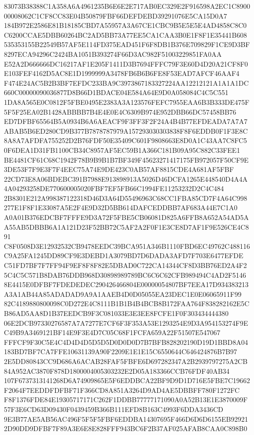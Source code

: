 \documentclass[UTF8,fontset=fandol,zihao=-4,a4paper]{ctexart}
\begin{document}
{{83073B38388C1A358A6A4961235B6E6E2E717AB0EC329E2F916598A2EC1C890000008062C1CF8CC83E04B50879FBF66DEFDEBD39291076E5CA15D0A7
184B972E2586E81B18185CBD7A55957A3A67CE1CBC9B5E5E5E4AD4858C8C0C6200CCAE5DBB60264BC2AD5BB73A77EE5CA1CAA3B0E1F8F1E35441B608
535353155B22549B57AF5E114FD375EAD451F6F8DB1B376E709829F1CE9D3BF8297ECA94296C2424BA1051B393274F66D3AC982F51003229851FA0AA
E52A2D666666DC16217AF1E205F1411D3B7694FFFC79F3E60D4D20A21CF8F0E103FEF4162D5AC8E1D1999999A3478FB6B6B6FE8F53EAD7AFCF46AAF4
F474E24AC5B2B3BF7EFDC233BA9C3973867183327224AA12212121A1A1A1DC660C00000090036877D8B66D1BDACE04E584A64E9D0A058084C4C5C551
1DA8A565E0C0812F5FBE0495E2383A3A123576FEFC7955EAA6B3B333DE475F5F5F25EA02B1428ABBBB7B4E4E0E4C6309B974E952DBB66DC57458BB76
ED7DFBF65564B5A0934B6A6AEACF9F3FF3F2F24A4B4B77EFDEADA7A7A7ABAB5B6ED280CD9B377B7878787979A157293030303838F8F6EDDB0F1F3E8C
8A8A7AFDFA755252D2B76FDF50E35409C601F9808663E8D0A1C43AA7C8FC50F6DEA1D31FB1100CB34C8957AF5EC59B1A366C181B09A95C882C33FEE1
BE4481CF61C68C1942F78B9B9B1B7BF349F45623271417175FB972057F50CF9E3DE53F7F9E3F7F4EEC75A74E9DE423C0AB57AF8815CDE4A681AF5FBF
22CD73E8A06BDEBC391B7988E913898913A5026D46DCFA1265E448540D4A4A4A04293258DE770600005020FBF7EF5FB66C1994FE11253232D2C4C484
2B8301E212A998387122318D46D3A64D55496963C68CC1FBA85CD7F4A64C998277E1F8F1E33087A5E2F4E9D32D5BB614DAFCEDDBB7AF683A44E7C1A0
A0A01B376EDCBF7FFFE9D3A72F5FBE5CB06081D825A6FFB8A652A54AD5AA55AB5DBBB6A1A121D23F52BB72C5AF2A2F0F1E3CE8D7AF1F9E526CE4C891
C8F0508D3E12932532CB9478EEDC39BCA951A346B1110FBD6EC49762C488116C9A25FA1245DD89CF9E3DEBD1A3079BD7D6DADA3AFD7F703E6477EFDE
C51FD7BF7F7FF94F9EF8F8F82E5DBAD0C722CA14344CF8D3BB76ED2A4F25C4C5C571B8DAB76DDB968D30898989789BC6C6C62CFB989494C4AD2F5146
8E4415E0DFBF7FDEDEDEC290426466804E00000054807BF7EEA17D934383213A3A1AB44A85ADADAD9A9A1AAEB4D0D05055EA23DEC1E0E06065911F99
82C4189880800098C0D272E4C8111B1B1B4B4BCB8B172FAA764F838282162E5CB86AD5AA8D1B37EEDCB9F3C081033E3E3EE8FCFE1F0F303434444380
06E2DCB97330276587A7A7277E7CF6F3F353A53E1293254E9D3A954153274F9EC49B9A3469121BF14E9F3E4D7C05C68F1FCFA659A22F51507E547067
FFFCF9F30C5E4C4D4D4D5D5D5D0D0D0D7B7BFB828202190D19D1BBD8A04183BD7BF7CA7FFE10631139A90F2209E1E1E15C6550644C646424876B7B97
2E5DD80843CC9D686A6ACAB28FAF5FBFE6D697282347A2B2939797275A2CB84A952AC3870F878D1800004005303232E2D05A183366CCB76FDF40AB34
107F6737313141268D6A74909865E5F6EDDBCA22BF9D9D1D716E5FBE7C19662F2064F7EEDDFDFBF71F366CD8A851A3264D9AD4AE5DBBFF780F1272FC
F8F1376FDE84E19305717171C262F1DDBB77777171090A0A52B13E1E3870009F57F3E6CD63D09430F0439459B366B111EFD8B163C4993F6DDA3436CD
9E3B77AE5AB56AC496F5F5F5FBF6EDDBA14307695F466D6D6D6155EB929212D90DD9DFBF7F89A3E6E8E828FFF943BC6F2B37AF025AFAB8CAA0C898B0
}}
\end{document}
